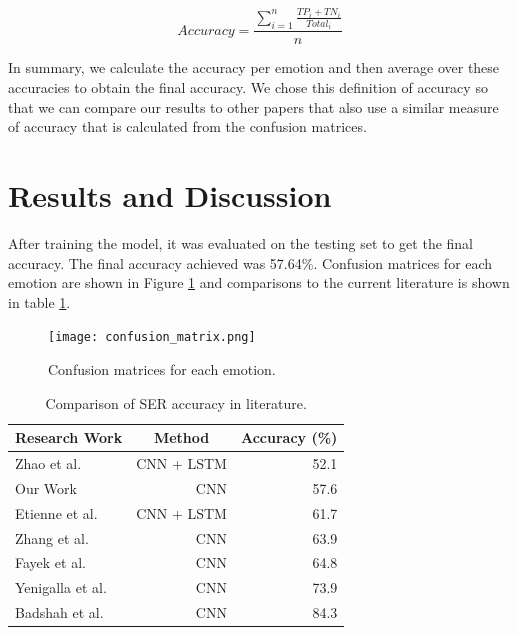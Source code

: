 \documentclass[conference]{IEEEtran}
\begin{document}
\begin{equation}
\label{aveacc}
Accuracy = \frac{\sum_{i=1}^{n}\frac{TP_{i} + TN_{i}}{Total_{i}}}{n}
\end{equation}

In summary, we calculate the accuracy per emotion and then average over these accuracies to obtain the final accuracy. We chose this definition of accuracy so that we can compare our results to other papers that also use a similar measure of accuracy that is calculated from the confusion matrices.

\section{Results and Discussion}

After training the model, it was evaluated on the testing set to get the final accuracy. The final accuracy achieved was 57.64\%. Confusion matrices for each emotion are shown in Figure \ref{confusionMatrix} and comparisons to the current literature is shown in table \ref{litacccompare}.

\begin{figure}[h!]
	\centering
	\hspace{6mm}
	\texttt{[image: confusion\_matrix.png]}
	\caption{Confusion matrices for each emotion.}
	\label{confusionMatrix}
\end{figure}

\bgroup
\def\arraystretch{2}
\begin{table}[]
	\centering
	\caption{Comparison of SER accuracy in literature.}
	\label{litacccompare}
	\begin{tabular}{|l|r|r|}
		\hline
		\multicolumn{1}{|c|}{\textbf{Research Work}} & \multicolumn{1}{c|}{\textbf{Method}} & \multicolumn{1}{c|}{\textbf{Accuracy (\%)}} \\ \hline
		\rowcolor[HTML]{F6F8FA}
		Zhao et al. \cite{Zhao2019} & CNN + LSTM & 52.1 \\ \hline
		Our Work & CNN & 57.6 \\ \hline
		\rowcolor[HTML]{F6F8FA}
		Etienne et al. \cite{Etienne2018} & CNN + LSTM & 61.7 \\ \hline
		Zhang et al. \cite{Zhang2019} & CNN & 63.9 \\ \hline
		\rowcolor[HTML]{F6F8FA}
		Fayek et al. \cite{Fayek2017} & CNN & 64.8 \\ \hline
		Yenigalla et al. \cite{Yenigalla2018} & CNN & 73.9 \\ \hline
		\rowcolor[HTML]{F6F8FA}
		Badshah et al. \cite {Badshah2019} & CNN & 84.3 \\ \hline
	\end{tabular}
\end{table}
\egroup
\end{document}
